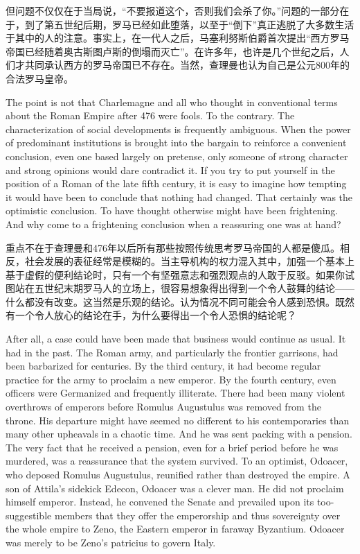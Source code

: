 \begin{Parallel}{97mm}{45mm}
  \ParallelRText
  {但问题不仅仅在于当局说，“不要报道这个，否则我们会杀了你。”问题的一部分在于，到了第五世纪后期，罗马已经如此堕落，以至于“倒下”真正逃脱了大多数生活于其中的人的注意。事实上，在一代人之后，马塞利努斯伯爵首次提出“西方罗马帝国已经随着奥古斯图卢斯的倒塌而灭亡”。在许多年，也许是几个世纪之后，人们才共同承认西方的罗马帝国已不存在。当然，查理曼也认为自己是公元800年的合法罗马皇帝。}
  \ParallelPar


  \ParallelLText
  {The point is not that Charlemagne and all who thought in conventional terms about the Roman Empire after 476 were fools. To the contrary. The characterization of social developments is frequently ambiguous. When the power of predominant institutions is brought into the bargain to reinforce a convenient conclusion, even one based largely on pretense, only someone of strong character and strong opinions would dare contradict it. If you try to put yourself in the position of a Roman of the late fifth century, it is easy to imagine how tempting it would have been to conclude that nothing had changed. That certainly was the optimistic conclusion. To have thought otherwise might have been frightening. And why come to a frightening conclusion when a reassuring one was at hand?}
  
  \ParallelRText
  {重点不在于查理曼和476年以后所有那些按照传统思考罗马帝国的人都是傻瓜。相反，社会发展的表征经常是模糊的。当主导机构的权力混入其中，加强一个基本上基于虚假的便利结论时，只有一个有坚强意志和强烈观点的人敢于反驳。如果你试图站在五世纪末期罗马人的立场上，很容易想象得出得到一个令人鼓舞的结论——什么都没有改变。这当然是乐观的结论。认为情况不同可能会令人感到恐惧。既然有一个令人放心的结论在手，为什么要得出一个令人恐惧的结论呢？}
  \ParallelPar


  \ParallelLText
  {After all, a case could have been made that business would continue as usual. It had in the past. The Roman army, and particularly the frontier garrisons, had been barbarized for centuries. By the third century, it had become regular practice for the army to proclaim a new emperor. By the fourth century, even officers were Germanized and frequently illiterate. There had been many violent overthrows of emperors before Romulus Augustulus was removed from the throne. His departure might have seemed no different to his contemporaries than many other upheavals in a chaotic time. And he was sent packing with a pension. The very fact that he received a pension, even for a brief period before he was murdered, was a reassurance that the system survived. To an optimist, Odoacer, who deposed Romulus Augustulus, reunified rather than destroyed the empire. A son of Attila's sidekick Edecon, Odoacer was a clever man. He did not proclaim himself emperor. Instead, he convened the Senate and prevailed upon its too-suggestible members that they offer the emperorship and thus sovereignty over the whole empire to Zeno, the Eastern emperor in faraway Byzantium. Odoacer was merely to be Zeno's patricius to govern Italy.}
  

\end{Parallel}
